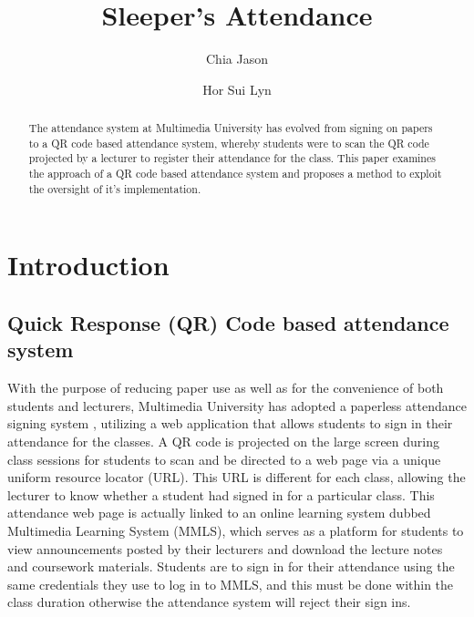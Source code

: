 \documentclass[runningheads]{llncs}
\begin{document}
\title{Sleeper's Attendance}
%
\author{Chia Jason \and
Hor Sui Lyn}
%
%
%
\maketitle              %
%
\begin{abstract}
The attendance system at Multimedia University has evolved from signing on papers to a QR code based attendance system, whereby students were to scan the QR code projected by a lecturer to register their attendance for the class. This paper examines the approach of a QR code based attendance system and proposes a method to exploit the oversight of it's implementation. 
%
\end{abstract}
%
%
%
\section{Introduction}
\subsection{Quick Response (QR) Code based attendance system}
With the purpose of reducing paper use as well as for the convenience of both students and lecturers, Multimedia University has adopted a paperless attendance signing system \cite{news_art_2018}, utilizing a web application that allows students to sign in their attendance for the classes. A QR code is projected on the large screen during class sessions for students to scan and be directed to a web page via a unique uniform resource locator (URL). This URL is different for each class, allowing the lecturer to know whether a student had signed in for a particular class. This attendance web page is actually linked to an online learning system dubbed Multimedia Learning System (MMLS), which serves as a platform for students to view announcements posted by their lecturers and download the lecture notes and coursework materials. Students are to sign in for their attendance using the same credentials they use to log in to MMLS, and this must be done within the class duration otherwise the attendance system will reject their sign ins.
\end{document}
